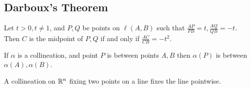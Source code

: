 \subsection{Darboux's Theorem}

\begin{lemma}
    Let \(t > 0, t \neq 1\), and \(P, Q\) be points on \(\ell(A, B)\) such that \(\frac{AP}{PB} = t, \frac{AQ}{QB} = -t\). Then \(C\) is the midpoint of \(P, Q\) if and only if \(\frac{AC}{CB} = -t^2\).
\end{lemma}

\begin{theorem}
    If \(\alpha\) is a collineation, and point \(P\) is between points \(A, B\) then \(\alpha(P)\) is between \(\alpha(A), \alpha(B)\).
\end{theorem}

\begin{corollary}
    A collineation on \(\mathbb{R}^n\) fixing two points on a line fixes the line pointwise.
\end{corollary}

\pagebreak